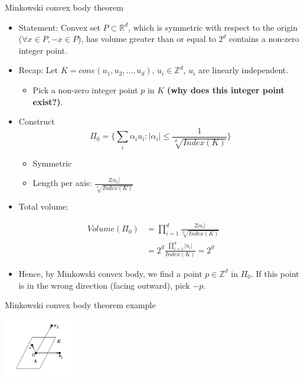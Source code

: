 \documentclass[8pt]{beamer}
\begin{document}
\begin{frame}[label=sec-19]{Minkowski convex body theorem}
\begin{itemize}
\item Statement: Convex set $P \subset \mathbb{R}^d$, which is symmetric with respect to the origin ($\forall x \in P, -x \in P$), has volume greater than or
equal to $2^d$ contains a non-zero integer point.

\item Recap: Let $K = cone(u_1, u_2, \ldots, u_d)$, $u_i \in \mathbb{Z}^d$, $u_i$ are linearly independent.
\begin{itemize}
\item Pick a non-zero integer point $p$ in $K$ \textbf{(why does this integer point exist?)}.
\end{itemize}

\item Construct $$\Pi_0 = \Bigg\{ \sum_i \alpha_i u_i :  |\alpha_i| \leq \frac{1}{\sqrt[d]{Index(K)}}  \Bigg\}$$
\begin{itemize}
\item Symmetric
\item Length per axis: $\frac{2 |u_i|}{\sqrt[d]{Index(K)}}$
\end{itemize}

\item Total volume:
\end{itemize}
\begin{align*}
Volume(\Pi_0) &= \prod_{i=1}^d \frac{2 |u_i|}{\sqrt[d]{Index(K)}}\\
 &= 2^d \frac{ \prod_{i=1}^d |u_i| }{Index(K)} = 2^d
\end{align*}

\begin{itemize}
\item Hence, by Minkowski convex body, we find a point $p \in \mathbb{Z}^d$ in $\Pi_0$. If this point is in the wrong direction (facing outward), pick $-p$.
\end{itemize}
\end{frame}

\begin{frame}[label=sec-20]{Minkowski convex body theorem example}
\begin{center}
\includegraphics[width=3cm, keepaspectratio]{res/minkowski-convex-body}
\end{center}
\end{frame}
\end{document}
